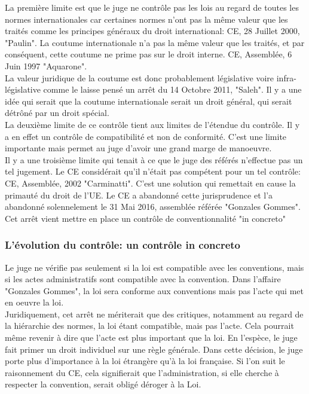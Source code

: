 \documentclass[10pt, a4paper, openany]{book}
\begin{document}
La première limite est que le juge ne contrôle pas les lois au regard de toutes les normes internationales car certaines normes n'ont pas la même valeur que les traités comme les principes généraux du droit international: CE, 28 Juillet 2000, "Paulin". La coutume internationale n'a pas la même valeur que les traités, et par conséquent, cette coutume ne prime pas sur le droit interne. CE, Assemblée, 6 Juin 1997 "Aquarone". \\
La valeur juridique de la coutume est donc probablement législative voire infra-législative comme le laisse pensé un arrêt du 14 Octobre 2011, "Saleh". Il y a une idée qui serait que la coutume internationale serait un droit général, qui serait détrôné par un droit spécial. \\
La deuxième limite de ce contrôle tient aux limites de l'étendue du contrôle. Il y a en effet un contrôle de compatibilité et non de conformité. C'est une limite importante mais permet au juge d'avoir une grand marge de manoeuvre. \\
Il y a une troisième limite qui tenait à ce que le juge des référés n'effectue pas un tel jugement. Le CE considérait qu'il n'était pas compétent pour un tel contrôle: CE, Assemblée, 2002 "Carminatti". C'est une solution qui remettait en cause la primauté du droit de l'UE. Le CE a abandonné cette jurisprudence et l'a abandonné solennelement le 31 Mai 2016, assemblée référée "Gonzales Gommes". Cet arrêt vient mettre en place un contrôle de conventionnalité "in concreto"

\subsubsection{L'évolution du contrôle: un contrôle in concreto}

Le juge ne vérifie pas seulement si la loi est compatible avec les conventions, mais si les actes administratifs sont compatible avec la convention. Dans l'affaire "Gonzales Gommes", la loi sera conforme aux conventions mais pas l'acte qui met en oeuvre la loi. \\
Juridiquement, cet arrêt ne mériterait que des critiques, notamment au regard de la hiérarchie des normes, la loi étant compatible, mais pas l'acte. Cela pourrait même revenir à dire que l'acte est plus important que la loi. En l'espèce, le juge fait primer un droit individuel sur une règle générale. Dans cette décision, le juge porte plus d'importance à la loi étrangère qu'à la loi française. Si l'on suit le raisonnement du CE, cela signifierait que l'administration, si elle cherche à respecter la convention, serait obligé déroger à la Loi. 
\end{document}
